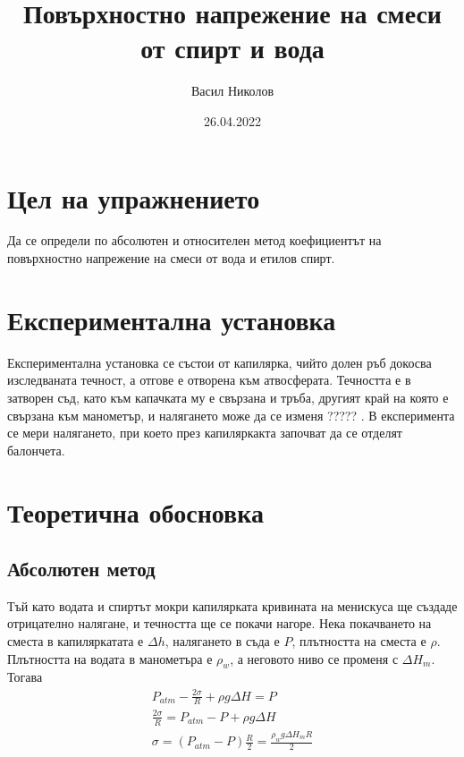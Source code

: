 \documentclass[reprint,amsmath,amssymb,aps,floatfix]{revtex4-2}
\begin{document}
\title{Повърхностно напрежение на смеси от спирт и вода}

\author{Васил Николов}
\date{26.04.2022}
\maketitle


\section{Цел на упражнението}

Да се определи по абсолютен и относителен метод коефициентът на повърхностно напрежение на смеси от вода и етилов спирт. 

\section{Експериментална установка}

Експериментална установка се състои от капилярка, чийто долен ръб докосва изследваната течност, а отгове е отворена към атвосферата. Течността е в затворен съд, като към капачката му е свързана и тръба, другият край на която е свързана към манометър, и налягането може да се изменя ????? . В експеримента се мери налягането, при което през капиляркакта започват да се отделят балончета. 

\section{Теоретична обосновка}
\subsection{Абсолютен метод}

Тъй като водата и спиртът мокри капилярката кривината на менискуса ще създаде отрицателно налягане, и течността ще се покачи нагоре. Нека покачването на сместа в капиляркатата е $\Delta h$, налягането в съда е $P$, плътността на сместа е $\rho$. Плътността на водата в манометъра е $\rho_w$, а неговото ниво се променя с $\Delta H_m$. Тогава 
\begin{gather*}
    P_{atm} - \frac{2\sigma}{R} + \rho g \Delta H = P \\
    \frac{2\sigma}{R} = P_{atm} - P + \rho g \Delta H \\
    \sigma = (P_{atm} - P)\frac{R}{2} = \frac{\rho_w g \Delta H_m R}{2} \label{eq:1} \tag{1}
\end{gather*}
\end{document}
